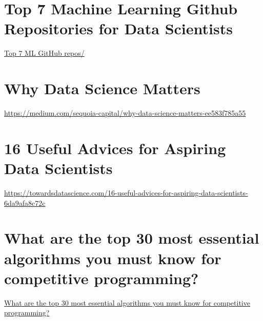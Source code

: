 \documentclass[11pt]{article}
\begin{document}
\newpage
\section{Top 7 Machine Learning Github Repositories for Data Scientists}
\href{https://www.analyticsvidhya.com/blog/2019/06/top-7-machine-learning-github-repositories-data-scientists/}{Top 7 ML GitHub repos/} 


\newpage
\section{Why Data Science Matters}
\href{https://medium.com/sequoia-capital/why-data-science-matters-ee583f785a55}{https://medium.com/sequoia-capital/why-data-science-matters-ee583f785a55}


\newpage
\section{16 Useful Advices for Aspiring Data Scientists}
\href{https://towardsdatascience.com/16-useful-advices-for-aspiring-data-scientists-6da9afa8c72c}{https://towardsdatascience.com/16-useful-advices-for-aspiring-data-scientists-6da9afa8c72c}


\newpage
\section{What are the top 30 most essential algorithms you must know for competitive programming?}
\href{https://www.quora.com/What-are-the-top-30-most-essential-algorithms-you-must-know-for-competitive-programming}{What are the top 30 most essential algorithms you must know for competitive programming?}\\

\end{document}
